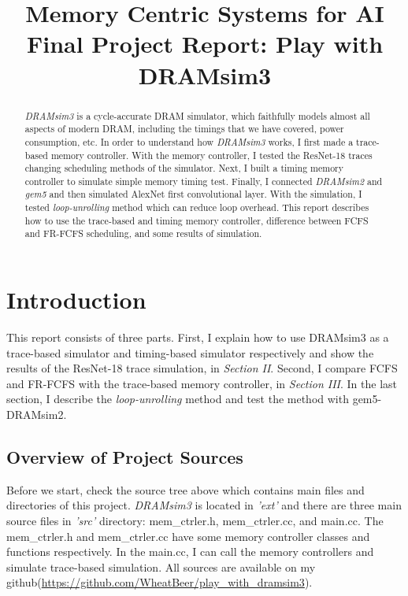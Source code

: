 \documentclass[conference]{IEEEtran}
\begin{document}
\title{Memory Centric Systems for AI Final Project Report: Play with DRAMsim3}
\author{
}

\maketitle

\begin{abstract}
\emph{DRAMsim3}\cite{li2020dramsim3} is a cycle-accurate DRAM simulator, which faithfully models almost all aspects of modern DRAM, including the timings that we have covered, power consumption, etc.
In order to understand how \emph{DRAMsim3} works, I first made a trace-based memory controller.
With the memory controller, I tested the ResNet-18 traces changing scheduling methods of the simulator. 
Next, I built a timing memory controller to simulate simple memory timing test. 
Finally, I connected \emph{DRAMsim2} and \emph{gem5}\cite{binkert2011gem5} and then simulated AlexNet first convolutional layer.
With the simulation, I tested \emph{loop-unrolling} method which can reduce loop overhead. 
This report describes how to use the trace-based and timing memory controller, difference between FCFS and FR-FCFS scheduling, and some results of simulation.
\end{abstract}

\section{Introduction} \label{sec:introduction}
This report consists of three parts.
First, I explain how to use DRAMsim3 as a trace-based simulator and timing-based simulator respectively and show the results of the ResNet-18 trace simulation, in \emph{Section II}.
Second, I compare FCFS and FR-FCFS with the trace-based memory controller, in \emph{Section III}. 
In the last section, I describe the \emph{loop-unrolling} method and test the method with gem5-DRAMsim2.

\subsection{Overview of Project Sources}


Before we start, check the source tree above which contains main files and directories of this project.
\emph{DRAMsim3} is located in \emph{'ext'} and there are three main source files in \emph{'src'} directory: mem\_ctrler.h, mem\_ctrler.cc, and main.cc. 
The mem\_ctrler.h and mem\_ctrler.cc have some memory controller classes and functions respectively. 
In the main.cc, I can call the memory controllers and simulate trace-based simulation.  
All sources are available on my github(\url{https://github.com/WheatBeer/play_with_dramsim3}).
\end{document}
